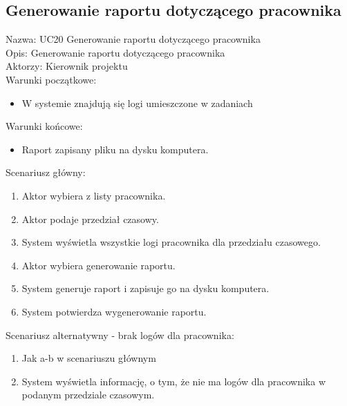 \subsection{Generowanie raportu dotyczącego pracownika}
Nazwa: UC20 Generowanie raportu dotyczącego pracownika \\
Opis: Generowanie raportu dotyczącego pracownika \\
Aktorzy: Kierownik projektu \\
Warunki początkowe:
\begin{itemize}
\item W systemie znajdują się logi umieszczone w zadaniach
\end{itemize}
Warunki końcowe:
\begin{itemize}
\item Raport zapisany pliku na dysku komputera.
\end{itemize}
Scenariusz główny:
\begin{enumerate}
\item Aktor wybiera z listy pracownika.
\item Aktor podaje przedział czasowy.
\item System wyświetla wszystkie logi pracownika dla przedziału czasowego.
\item Aktor wybiera generowanie raportu.
\item System generuje raport i zapisuje go na dysku komputera.
\item System potwierdza wygenerowanie raportu.
\end{enumerate}
Scenariusz alternatywny - brak logów dla pracownika: 
\begin{enumerate}
\item Jak a-b w scenariuszu głównym
\item System wyświetla informację, o tym, że nie ma logów dla pracownika w podanym przedziale czasowym.
\end{enumerate}


